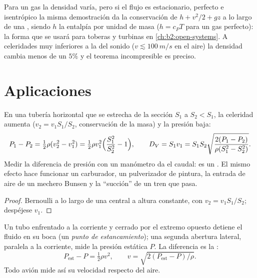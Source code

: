\begin{remark}\label{rem:b2:euler-bernoulli:compressible}
Para un gas la densidad varía, pero si el flujo es estacionario, perfecto
e isentrópico la misma demostración da la conservación de $h + v^2/2 + gz$
a lo largo de una , siendo $h$ la entalpía por unidad de
masa ($h = c_PT$ para un gas perfecto): la forma que se usará para toberas
y turbinas en \cref{ch:b2:open-systems}. A celeridades muy inferiores a la
del sonido ($v \lesssim \qty{100}{m/s}$ en el aire) la densidad cambia
menos de un $5\%$ y el teorema incompresible es preciso.
\end{remark}

\section{Aplicaciones}

\begin{proposition}\label{prop:b2:euler-bernoulli:venturi}
En una tubería horizontal que se estrecha de la sección $S_1$ a $S_2 < S_1$,
la celeridad aumenta ($v_2 = v_1S_1/S_2$, conservación de la masa) y la
presión baja:
\[
P_1 - P_2 = \tfrac12\rho(v_2^2 - v_1^2) = \tfrac12\rho v_1^2\Bigl(\frac{S_1^2}{S_2^2} - 1\Bigr) ,
\qquad
D_V = S_1v_1 = S_1S_2\sqrt{\frac{2(P_1 - P_2)}{\rho(S_1^2 - S_2^2)}} .
\]
Medir la diferencia de presión con un manómetro da el caudal: es un
\emph{}. El mismo efecto hace funcionar un carburador, un
pulverizador de pintura, la entrada de aire de un mechero Bunsen y la
``succión'' de un tren que pasa.
\end{proposition}

\begin{proof}
Bernoulli a lo largo de una  central a altura constante, con $v_2 =
v_1S_1/S_2$; despéjese $v_1$.
\end{proof}

\begin{proposition}\label{prop:b2:euler-bernoulli:pitot}
Un tubo enfrentado a la corriente y cerrado por el extremo opuesto detiene
el fluido en su boca (un \emph{punto de estancamiento}); una segunda
abertura lateral, paralela a la corriente, mide la presión estática $P$.
La diferencia es la :
\[
P_{\text{est}} - P = \tfrac12\rho v^2 , \qquad v = \sqrt{2(P_{\text{est}} - P)/\rho} .
\]
Todo avión mide así su velocidad respecto del aire.
\end{proposition}

